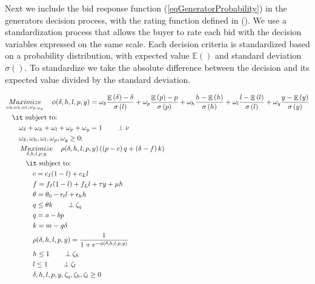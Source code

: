 \documentclass[informs]{informs3}
\begin{document}
Next we include the bid response function (\ref{eqGeneratorProbability}) in the generators decision process, with the rating function defined in (\label{eqGeneratorRating}). We use a standardization process that allows the buyer to rate each bid with the decision variables expressed on the same scale. Each decision criteria is standardized based on a probability distribution, with expected value ${\mathbb{E}()} $ and standard deviation ${\sigma\left(\right)}$. To standardize we take the absolute difference between the decision and its expected value divided by the standard deviation.


\begin{subequations}\label{eqBuyersProblem}
	\begin{align}
	&\mathop {Maximize}\limits_{\omega_{\delta},\omega_{h},\omega_{l},\omega_{p,\omega_{y}}}
	\quad \phi(\delta, h, l, p, y) =  	 \omega_{\delta}\frac{\mathop{\mathbb{E}}\left(\delta\right)-\delta }
	{\sigma\left(l\right)}+\omega_{p}\frac{\mathop{\mathbb{E}}\left(p\right)-p}  {\sigma\left(p\right)} 
	+\omega_{h}\frac{ h-\mathop{\mathbb{E}}\left(h\right)}
	{\sigma\left(h\right)}+\omega_{l}\frac{ l-\mathop{\mathbb{E}}\left(l\right) }{\sigma\left(l\right)}+\omega_{y}\frac{y-\mathop{\mathbb{E}}\left(y\right)}{\sigma\left(y\right)} \label{eqBuyerObjective}\\
	&\quad \mbox{{\it subject to}:}\notag\\
 	&\qquad	 \omega_{\delta}+\omega_{h}+\omega_{l}+\omega_{p}+\omega_{y}=1\label{eqBuyerNormal} \qquad \perp \nu\\
	&\qquad  \omega_{\delta},\omega_{h},\omega_{l},\omega_{p},\omega_{y} \geq 0;\\		
	&\qquad \mathop {Maximize}\limits_{\delta, h, l, p, y}
	\quad \rho(\delta, h, l,p,y)\left(\left(p-c\right)q+\left(\delta-f\right)k\right) \label{eqGeneratorObjective}\\ 
	&\qquad \quad \mbox{{\it subject to}:}\notag\\
	&\qquad \qquad c = c_I(1-l)+c_Ll \label{eqBuyerMarginalCost}\\
	&\qquad \qquad f = f_I(1-l)+f_Ll+\tau y+\mu h \label{eqBuyerFixedCost}\\
	&\qquad \qquad \theta = \theta_0-\epsilon_l l  +\epsilon_h h \label{eqBuyerTheta}\\
    &\qquad \qquad q \leq \theta k	\label{eqBuyerEnergySupply} 	\qquad \perp \zeta_q\\
	&\qquad \qquad q = a - bp \label{eqBuyerEnergyDemand}\\	
	&\qquad \qquad k = m -g \delta \label{eqBuyerCapacityDemand}\\
	&\qquad	\qquad \rho(\delta, h, l, p,y)=\frac{1}{1+e^{-\phi(\delta, h, l, p, y)}} \label{eqGeneratorProbability}\\
	&\qquad \qquad  h \leq 1 \label{eqGeneratorFinance}		\qquad \perp \zeta_h\\
	&\qquad \qquad  l \leq 1 \label{eqGeneratorLocal}			\qquad \perp \zeta_l\\
	&\qquad \qquad  \delta, h, l, p, y, \zeta_q, \zeta_h, \zeta_l \geq 0 \label{eqGeneratorNon-Negative}
	\end{align}
\end{subequations}
\end{document}
